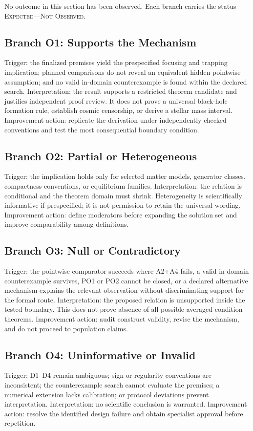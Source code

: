 \documentclass[conference]{IEEEtran}
\newcommand{\Expected}{\textsc{Expected---Not Observed}}
\begin{document}
No outcome in this section has been observed. Each branch carries the status \Expected.

\subsection{Branch O1: Supports the Mechanism}
Trigger: the finalized premises yield the prespecified focusing and trapping implication; planned comparisons do not reveal an equivalent hidden pointwise assumption; and no valid in-domain counterexample is found within the declared search. Interpretation: the result supports a restricted theorem candidate and justifies independent proof review. It does not prove a universal black-hole formation rule, establish cosmic censorship, or derive a stellar mass interval. Improvement action: replicate the derivation under independently checked conventions and test the most consequential boundary condition.

\subsection{Branch O2: Partial or Heterogeneous}
Trigger: the implication holds only for selected matter models, generator classes, compactness conventions, or equilibrium families. Interpretation: the relation is conditional and the theorem domain must shrink. Heterogeneity is scientifically informative if prespecified; it is not permission to retain the universal wording. Improvement action: define moderators before expanding the solution set and improve comparability among definitions.

\subsection{Branch O3: Null or Contradictory}
Trigger: the pointwise comparator succeeds where A2+A4 fails, a valid in-domain counterexample survives, PO1 or PO2 cannot be closed, or a declared alternative mechanism explains the relevant observation without discriminating support for the formal route. Interpretation: the proposed relation is unsupported inside the tested boundary. This does not prove absence of all possible averaged-condition theorems. Improvement action: audit construct validity, revise the mechanism, and do not proceed to population claims.

\subsection{Branch O4: Uninformative or Invalid}
Trigger: D1--D4 remain ambiguous; sign or regularity conventions are inconsistent; the counterexample search cannot evaluate the premises; a numerical extension lacks calibration; or protocol deviations prevent interpretation. Interpretation: no scientific conclusion is warranted. Improvement action: resolve the identified design failure and obtain specialist approval before repetition.
\end{document}

